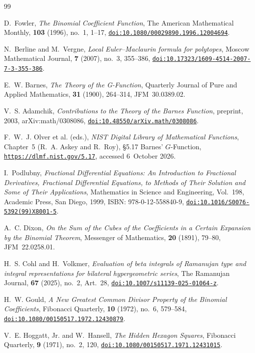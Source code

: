 \documentclass[11pt,a4paper]{article}
\theoremstyle{plain}
\theoremstyle{definition}
\theoremstyle{remark}
\numberwithin{equation}{section}
\providecommand{\doi}[1]{\href{https://doi.org/#1}{\texttt{doi:#1}}}
\begin{document}
\begin{thebibliography}{99}

D.~Fowler,
\emph{The Binomial Coefficient Function},
The American Mathematical Monthly, \textbf{103} (1996), no.~1, 1--17,
\doi{10.1080/00029890.1996.12004694}.

N.~Berline and M.~Vergne,
\emph{Local Euler--Maclaurin formula for polytopes},
Moscow Mathematical Journal, \textbf{7} (2007), no.~3, 355--386,
\doi{10.17323/1609-4514-2007-7-3-355-386}.

E.~W. Barnes,
\emph{The Theory of the G-Function},
Quarterly Journal of Pure and Applied Mathematics, \textbf{31} (1900), 264--314,
JFM~30.0389.02.

V.~S. Adamchik,
\emph{Contributions to the Theory of the Barnes Function},
preprint, 2003, arXiv:math/0308086,
\doi{10.48550/arXiv.math/0308086}.

F.~W.~J. Olver et al. (eds.),
\emph{NIST Digital Library of Mathematical Functions}, Chapter~5 (R.~A. Askey and R.~Roy), \S5.17 Barnes' $G$-Function,
\href{https://dlmf.nist.gov/5.17}{\texttt{https://dlmf.nist.gov/5.17}}, accessed 6~October 2026.

I.~Podlubny,
\emph{Fractional Differential Equations: An Introduction to Fractional Derivatives, Fractional Differential Equations, to Methods of Their Solution and Some of Their Applications},
Mathematics in Science and Engineering, Vol.~198, Academic Press, San Diego, 1999,
ISBN: 978-0-12-558840-9,
\doi{10.1016/S0076-5392(99)X8001-5}.

A.~C. Dixon,
\emph{On the Sum of the Cubes of the Coefficients in a Certain Expansion by the Binomial Theorem},
Messenger of Mathematics, \textbf{20} (1891), 79--80,
JFM~22.0258.01.

H.~S. Cohl and H.~Volkmer,
\emph{Evaluation of beta integrals of Ramanujan type and integral representations for bilateral hypergeometric series},
The Ramanujan Journal, \textbf{67} (2025), no.~2, Art.~28,
\doi{10.1007/s11139-025-01064-z}.

H.~W. Gould,
\emph{A New Greatest Common Divisor Property of the Binomial Coefficients},
Fibonacci Quarterly, \textbf{10} (1972), no.~6, 579--584,
\doi{10.1080/00150517.1972.12430879}.

V.~E. Hoggatt, Jr. and W.~Hansell,
\emph{The Hidden Hexagon Squares},
Fibonacci Quarterly, \textbf{9} (1971), no.~2, 120,
\doi{10.1080/00150517.1971.12431015}.


\end{thebibliography}
\end{document}
